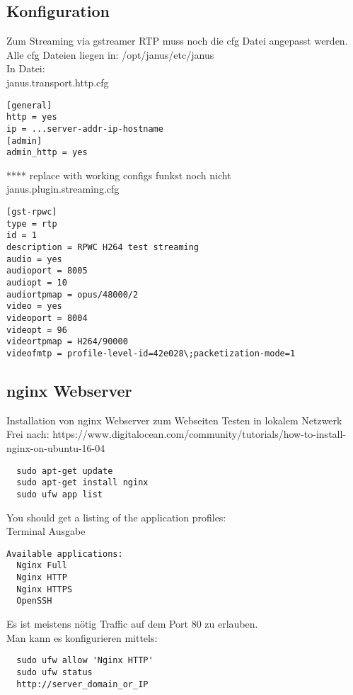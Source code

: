 \subsection{Konfiguration}
Zum Streaming via gstreamer RTP muss noch die cfg Datei angepasst werden.\\
Alle cfg Dateien liegen in: /opt/janus/etc/janus\\

In Datei:\\
janus.transport.http.cfg
\begin{verbatim}
[general]
http = yes
ip = ...server-addr-ip-hostname
[admin]
admin_http = yes
\end{verbatim}

**** replace with working configs funkst noch nicht\\
janus.plugin.streaming.cfg
\begin{verbatim}
[gst-rpwc]
type = rtp 
id = 1 
description = RPWC H264 test streaming 
audio = yes 
audioport = 8005 
audiopt = 10 
audiortpmap = opus/48000/2 
video = yes 
videoport = 8004 
videopt = 96 
videortpmap = H264/90000 
videofmtp = profile-level-id=42e028\;packetization-mode=1 
\end{verbatim}

\subsection{nginx Webserver}
Installation von nginx Webserver zum Webseiten Testen in lokalem Netzwerk\\
Frei nach: https://www.digitalocean.com/community/tutorials/how-to-install-nginx-on-ubuntu-16-04
\begin{verbatim}
  sudo apt-get update
  sudo apt-get install nginx
  sudo ufw app list
\end{verbatim}

You should get a listing of the application profiles:\\
Terminal Ausgabe
\begin{verbatim}
Available applications:
  Nginx Full
  Nginx HTTP
  Nginx HTTPS
  OpenSSH
\end{verbatim}

Es ist meistens nötig Traffic auf dem Port 80 zu erlauben.\\
Man kann es konfigurieren mittels:
\begin{verbatim}
  sudo ufw allow 'Nginx HTTP'
  sudo ufw status
  http://server_domain_or_IP
\end{verbatim}

